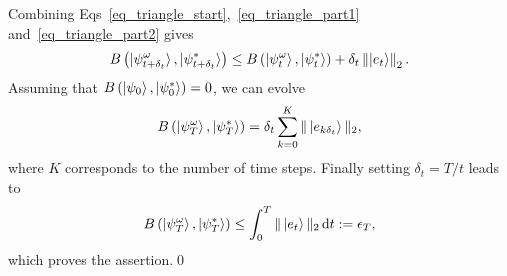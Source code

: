 \documentclass[twocolumn, aps, pra, superscriptaddress]{revtex4-1}
\newcommand{\norm}[1]{\left\lVert#1\right\rVert}
\newcommand*{\di}{\mathrm{d}} %
\begin{document}
Combining Eqs~\eqref{eq_triangle_start},~\eqref{eq_triangle_part1} and~\eqref{eq_triangle_part2} gives
\begin{align}
     B\left(\ket{\psi^{\omega}_{t+\delta_t}}, \ket{\psi^*_{t+\delta_t}}\right)
     \leq B\left(\ket{\psi^{\omega}_t}, \ket{\psi_t^*}\right) + \delta_t \norm{\ket{e_t}}_2.
\end{align}
Assuming that $B\left(\ket{\psi_0}, \ket{\psi_0^*}\right) = 0$, we can evolve
\begin{align}
B\left(\ket{\psi^{\omega}_{T}}, \ket{\psi_{T}^*}\right) = \delta_t\sum\limits_{k=0}^{K}\|\ket{e_{k\delta_t}}\|_2,
\end{align}
where $K$ corresponds to the number of time steps.
Finally setting $\delta_t = T/t$ leads to
\begin{align}
     B\left(\ket{\psi^{\omega}_{T}}, \ket{\psi_{T}^*}\right) \leq \int_{0}^{T} \|\ket{e_t}\|_2 \, \di t := \epsilon_T,
\end{align}
which proves the assertion.\qed


\end{document}

